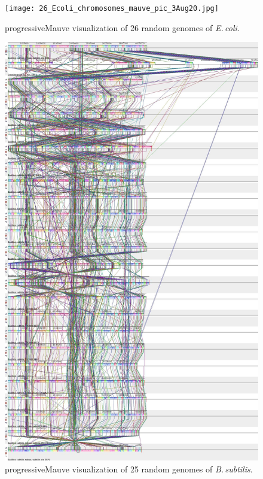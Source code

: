 \documentclass[12pt]{article}
\newcommand{\p}{progressiveMauve\xspace}
\newcommand{\bass}{\textit{B.\,subtilis}\xspace}
\newcommand{\ecol}{\textit{E.\,coli}\xspace}
\begin{document}
\begin{figure}
	\texttt{[image: 26\_Ecoli\_chromosomes\_mauve\_pic\_3Aug20.jpg]}
	\caption{\label{ecoli26_mauve} \p visualization of 26 random genomes of \ecol.}
\end{figure}
\begin{figure}
	\includegraphics[width=\textwidth]{25_Bass_chrom_mauve_pic_3Aug20.jpg}
	\caption{\label{bass25_mauve} \p visualization of 25 random genomes of \bass.}
\end{figure}
%
\end{document}

